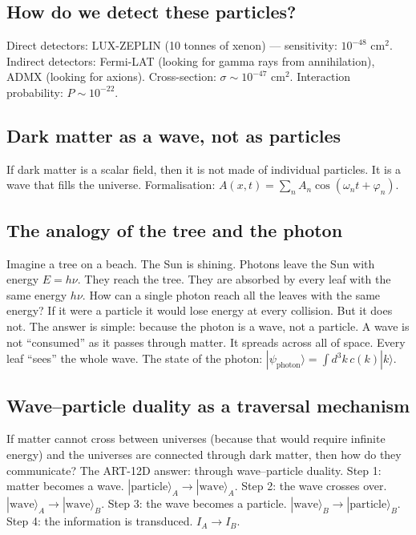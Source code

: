 \subsection{How do we detect these particles?}
Direct detectors: LUX-ZEPLIN (10 tonnes of xenon) --- sensitivity: $10^{-48}$ cm$^2$. Indirect detectors: Fermi-LAT (looking for gamma rays from annihilation), ADMX (looking for axions). Cross-section: $\sigma \sim 10^{-47}$ cm$^2$. Interaction probability: $P \sim 10^{-22}$.

\subsection{Dark matter as a wave, not as particles}
If dark matter is a scalar field, then it is not made of individual particles. It is a wave that fills the universe. Formalisation: $A(x,t) = \sum_n A_n \cos(\omega_n t + \varphi_n)$.

\subsection{The analogy of the tree and the photon}
Imagine a tree on a beach. The Sun is shining. Photons leave the Sun with energy $E = h\nu$. They reach the tree. They are absorbed by every leaf with the same energy $h\nu$. How can a single photon reach all the leaves with the same energy? If it were a particle it would lose energy at every collision. But it does not. The answer is simple: because the photon is a wave, not a particle. A wave is not ``consumed'' as it passes through matter. It spreads across all of space. Every leaf ``sees'' the whole wave. The state of the photon: $|\psi_{\text{photon}}\rangle = \int d^3k \, c(k) |k\rangle$.

\subsection{Wave--particle duality as a traversal mechanism}
If matter cannot cross between universes (because that would require infinite energy) and the universes are connected through dark matter, then how do they communicate? The ART-12D answer: through wave--particle duality. Step 1: matter becomes a wave. $|\text{particle}\rangle_A \to |\text{wave}\rangle_A$. Step 2: the wave crosses over. $|\text{wave}\rangle_A \to |\text{wave}\rangle_B$. Step 3: the wave becomes a particle. $|\text{wave}\rangle_B \to |\text{particle}\rangle_B$. Step 4: the information is transduced. $I_A \to I_B$.

